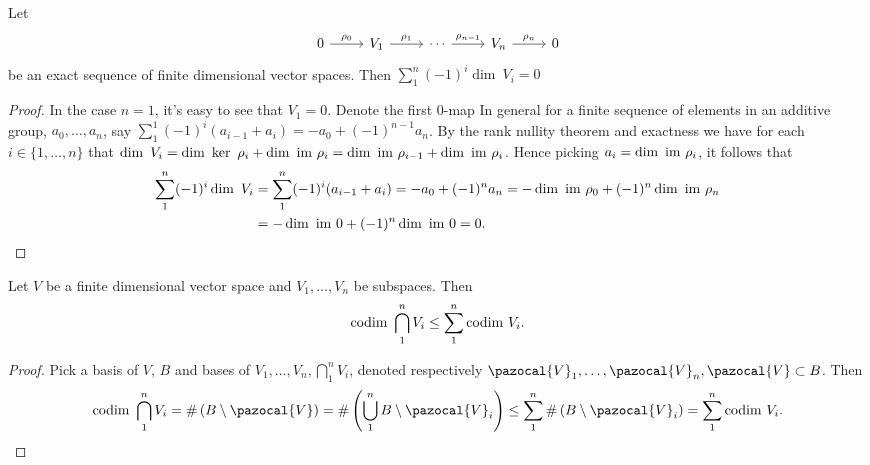     \begin{lemma}
        Let 
        $$\begin{tikzcd}
            0 \arrow[r,"\rho_0"] &V_1\arrow[r,"\rho_1"] & \cdots \arrow[r,"\rho_{n-1}"] & V_n\arrow[r,"\rho_n"] & 0
        \end{tikzcd}$$
        be an exact sequence of finite dimensional vector spaces. Then $\sum_1^n (-1)^i \dim\ V_i = 0$
    \end{lemma}
    \begin{proof}
        In the case $n=1$, it's easy to see that $V_1=0$. Denote the first $0$-map
        In general for a finite sequence of elements in an additive group, $a_0,\dots,a_n$, say $\sum_{1}^{1} (-1)^i(a_{i-1}+a_{i})= -a_0+(-1)^{n-1} a_n$. By the rank nullity theorem and exactness we have for each $i\in\{1,\dots,n\}$ that $\dim\ V_i = \dim\ \ker \ \rho_i +\dim \ \im \ \rho_i = \dim \ \im \ \rho_{i-1 } + \dim \ \im \ \rho_i$. Hence picking $a_i = \dim \ \im\ \rho_i$, it follows that 
        \begin{align*}
            \sum_1^n (-1)^i\dim\ V_i &= \sum_1^n (-1)^i(a_{i-1}+a_i)= -a_0 + (-1)^na_n = -\dim\ \mathrm{im} \ \rho_0 +(-1)^n \dim\ \mathrm{im} \ \rho_n\\ &= -\dim\ \mathrm{im} \ 0 +(-1)^n \dim\ \mathrm{im} \ 0 = 0.
        \end{align*}
    \end{proof}
    \begin{lemma}\label{CodimensionOfIntersectionIsBoundedBySumOfCodimensions}
        Let $V$ be a finite dimensional vector space and $V_1,\dots,V_n$ be subspaces. Then 
        $$\mathrm{codim} \ \bigcap_1^n V_i \leq \sum_1^n \mathrm{codim} \ V_i.$$
    \end{lemma}
    \begin{proof}
        Pick a basis of $V$, $B$ and bases of $V_1,\dots,V_n,\bigcap_1^n V_i$, denoted respectively $\pazocal{V}_1,\dots,\pazocal{V}_n,\pazocal{V}\subset B$. Then 
        $$\codim\ \bigcap_1^n V_i = \#\left( B\setminus \pazocal{V}\right)= \#\left(\bigcup_1^n B\setminus \pazocal{V}_i \right)\leq \sum_1^n \#\left(B\setminus \pazocal{V}_i\right)=\sum_1^n \codim\ V_i.$$
    \end{proof}
